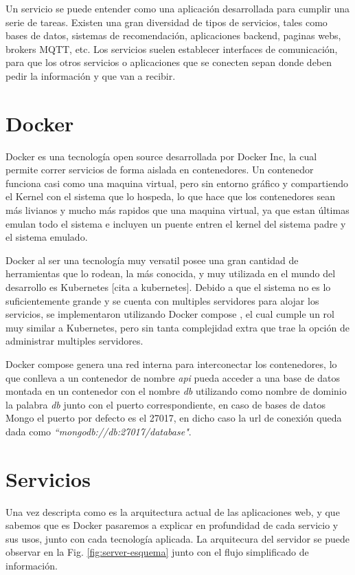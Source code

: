 Un servicio se puede entender como una aplicación desarrollada para cumplir una serie de tareas. Existen una gran diversidad de tipos de servicios, tales como bases de datos, sistemas de recomendación, aplicaciones backend, paginas webs, brokers MQTT, etc. Los servicios suelen establecer interfaces de comunicación, para que los otros servicios o aplicaciones que se conecten sepan donde deben pedir la información y que van a recibir.

\section{Docker}

Docker es una tecnología open source desarrollada por Docker Inc, la cual permite correr servicios de forma aislada en contenedores. Un contenedor funciona casi como una maquina virtual, pero sin entorno gráfico y compartiendo el Kernel \cite{keepcoding_que_2022} con el sistema que lo hospeda, lo que hace que los contenedores sean más livianos y mucho más rapidos que una maquina virtual, ya que estan últimas emulan todo el sistema e incluyen un puente entren el kernel del sistema padre y el sistema emulado.

Docker al ser una tecnología muy versatil posee una gran cantidad de herramientas que lo rodean, la más conocida, y muy utilizada en el mundo del desarrollo es Kubernetes [cita a kubernetes]. Debido a que el sistema no es lo suficientemente grande y se cuenta con multiples servidores para alojar los servicios, se implementaron utilizando Docker compose \cite{docker_inc_docker_2023}, el cual cumple un rol muy similar a Kubernetes, pero sin tanta complejidad extra que trae la opción de administrar multiples servidores.

Docker compose genera una red interna para interconectar los contenedores, lo que conlleva a un contenedor de nombre \textit{api} pueda acceder a una base de datos montada en un contenedor con el nombre \textit{db} utilizando como nombre de dominio la palabra \textit{db} junto con el puerto correspondiente, en caso de bases de datos Mongo el puerto por defecto es el 27017, en dicho caso la url de conexión queda dada como \textit{``mongodb://db:27017/database"}.

\section{Servicios}

Una vez descripta como es la arquitectura actual de las aplicaciones web, y que sabemos que es Docker pasaremos a explicar en profundidad de cada servicio y sus usos, junto con cada tecnología aplicada. La arquitecura del servidor se puede observar en la Fig. \ref{fig:server-esquema} junto con el flujo simplificado de información.

